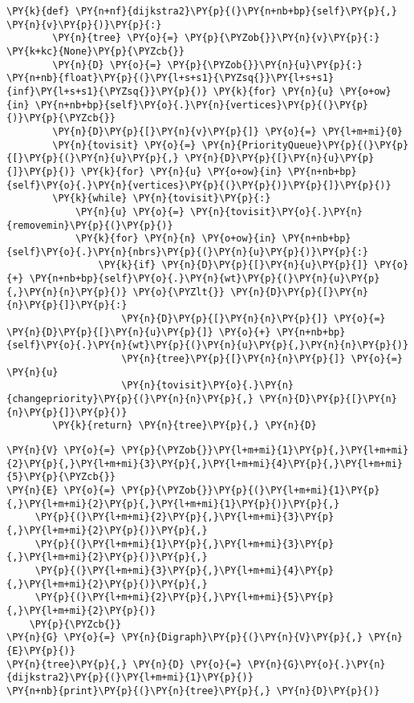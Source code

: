 \begin{Verbatim}[commandchars=\\\{\}]
    \PY{k}{def} \PY{n+nf}{dijkstra2}\PY{p}{(}\PY{n+nb+bp}{self}\PY{p}{,} \PY{n}{v}\PY{p}{)}\PY{p}{:}
        \PY{n}{tree} \PY{o}{=} \PY{p}{\PYZob{}}\PY{n}{v}\PY{p}{:} \PY{k+kc}{None}\PY{p}{\PYZcb{}}
        \PY{n}{D} \PY{o}{=} \PY{p}{\PYZob{}}\PY{n}{u}\PY{p}{:} \PY{n+nb}{float}\PY{p}{(}\PY{l+s+s1}{\PYZsq{}}\PY{l+s+s1}{inf}\PY{l+s+s1}{\PYZsq{}}\PY{p}{)} \PY{k}{for} \PY{n}{u} \PY{o+ow}{in} \PY{n+nb+bp}{self}\PY{o}{.}\PY{n}{vertices}\PY{p}{(}\PY{p}{)}\PY{p}{\PYZcb{}}
        \PY{n}{D}\PY{p}{[}\PY{n}{v}\PY{p}{]} \PY{o}{=} \PY{l+m+mi}{0}
        \PY{n}{tovisit} \PY{o}{=} \PY{n}{PriorityQueue}\PY{p}{(}\PY{p}{[}\PY{p}{(}\PY{n}{u}\PY{p}{,} \PY{n}{D}\PY{p}{[}\PY{n}{u}\PY{p}{]}\PY{p}{)} \PY{k}{for} \PY{n}{u} \PY{o+ow}{in} \PY{n+nb+bp}{self}\PY{o}{.}\PY{n}{vertices}\PY{p}{(}\PY{p}{)}\PY{p}{]}\PY{p}{)}
        \PY{k}{while} \PY{n}{tovisit}\PY{p}{:}
            \PY{n}{u} \PY{o}{=} \PY{n}{tovisit}\PY{o}{.}\PY{n}{removemin}\PY{p}{(}\PY{p}{)}
            \PY{k}{for} \PY{n}{n} \PY{o+ow}{in} \PY{n+nb+bp}{self}\PY{o}{.}\PY{n}{nbrs}\PY{p}{(}\PY{n}{u}\PY{p}{)}\PY{p}{:}
                \PY{k}{if} \PY{n}{D}\PY{p}{[}\PY{n}{u}\PY{p}{]} \PY{o}{+} \PY{n+nb+bp}{self}\PY{o}{.}\PY{n}{wt}\PY{p}{(}\PY{n}{u}\PY{p}{,}\PY{n}{n}\PY{p}{)} \PY{o}{\PYZlt{}} \PY{n}{D}\PY{p}{[}\PY{n}{n}\PY{p}{]}\PY{p}{:}
                    \PY{n}{D}\PY{p}{[}\PY{n}{n}\PY{p}{]} \PY{o}{=} \PY{n}{D}\PY{p}{[}\PY{n}{u}\PY{p}{]} \PY{o}{+} \PY{n+nb+bp}{self}\PY{o}{.}\PY{n}{wt}\PY{p}{(}\PY{n}{u}\PY{p}{,}\PY{n}{n}\PY{p}{)}
                    \PY{n}{tree}\PY{p}{[}\PY{n}{n}\PY{p}{]} \PY{o}{=} \PY{n}{u}
                    \PY{n}{tovisit}\PY{o}{.}\PY{n}{changepriority}\PY{p}{(}\PY{n}{n}\PY{p}{,} \PY{n}{D}\PY{p}{[}\PY{n}{n}\PY{p}{]}\PY{p}{)}
        \PY{k}{return} \PY{n}{tree}\PY{p}{,} \PY{n}{D}
\end{Verbatim}



\begin{Verbatim}[commandchars=\\\{\}]
\PY{n}{V} \PY{o}{=} \PY{p}{\PYZob{}}\PY{l+m+mi}{1}\PY{p}{,}\PY{l+m+mi}{2}\PY{p}{,}\PY{l+m+mi}{3}\PY{p}{,}\PY{l+m+mi}{4}\PY{p}{,}\PY{l+m+mi}{5}\PY{p}{\PYZcb{}}
\PY{n}{E} \PY{o}{=} \PY{p}{\PYZob{}}\PY{p}{(}\PY{l+m+mi}{1}\PY{p}{,}\PY{l+m+mi}{2}\PY{p}{,}\PY{l+m+mi}{1}\PY{p}{)}\PY{p}{,}
     \PY{p}{(}\PY{l+m+mi}{2}\PY{p}{,}\PY{l+m+mi}{3}\PY{p}{,}\PY{l+m+mi}{2}\PY{p}{)}\PY{p}{,}
     \PY{p}{(}\PY{l+m+mi}{1}\PY{p}{,}\PY{l+m+mi}{3}\PY{p}{,}\PY{l+m+mi}{2}\PY{p}{)}\PY{p}{,}
     \PY{p}{(}\PY{l+m+mi}{3}\PY{p}{,}\PY{l+m+mi}{4}\PY{p}{,}\PY{l+m+mi}{2}\PY{p}{)}\PY{p}{,}
     \PY{p}{(}\PY{l+m+mi}{2}\PY{p}{,}\PY{l+m+mi}{5}\PY{p}{,}\PY{l+m+mi}{2}\PY{p}{)}
    \PY{p}{\PYZcb{}}
\PY{n}{G} \PY{o}{=} \PY{n}{Digraph}\PY{p}{(}\PY{n}{V}\PY{p}{,} \PY{n}{E}\PY{p}{)}
\PY{n}{tree}\PY{p}{,} \PY{n}{D} \PY{o}{=} \PY{n}{G}\PY{o}{.}\PY{n}{dijkstra2}\PY{p}{(}\PY{l+m+mi}{1}\PY{p}{)}
\PY{n+nb}{print}\PY{p}{(}\PY{n}{tree}\PY{p}{,} \PY{n}{D}\PY{p}{)}
\end{Verbatim}

